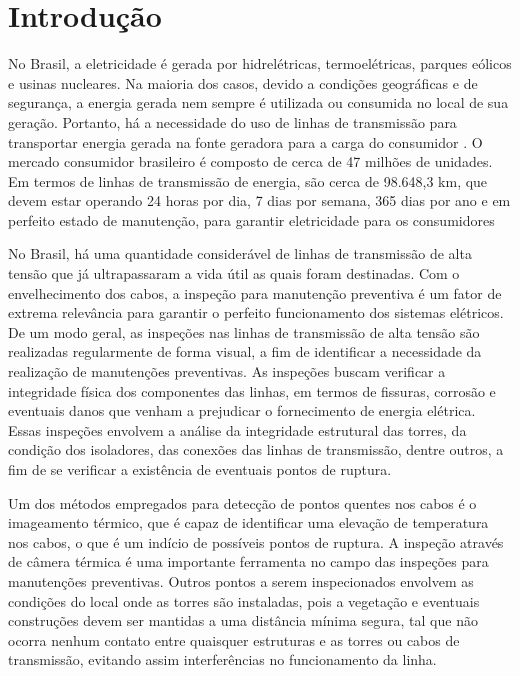 \chapter{Introdução}
\label{chap:intro}

No Brasil, a eletricidade é gerada por hidrelétricas, termoelétricas, parques eólicos e usinas nucleares. Na maioria dos casos, devido a condições geográficas e de segurança, a energia gerada nem sempre é utilizada ou consumida no local de sua geração. Portanto, há a necessidade do uso de linhas de transmissão para transportar energia gerada na fonte geradora para a carga do consumidor \cite{rangel2009sistema}. O mercado consumidor brasileiro é composto de cerca de 47 milhões de unidades. Em termos de linhas de transmissão de energia, são cerca de 98.648,3 km, que devem estar operando 24 horas por dia, 7 dias por semana, 365 dias por ano e em perfeito estado de manutenção, para garantir eletricidade para os consumidores \cite{ons2013dados}

No Brasil, há uma quantidade considerável de linhas de transmissão de alta tensão que já ultrapassaram a vida útil as quais foram destinadas. Com o envelhecimento dos cabos, a inspeção para manutenção preventiva é um fator de extrema relevância para garantir o perfeito funcionamento dos sistemas elétricos. 
De um modo geral, as inspeções nas linhas de transmissão de alta tensão são realizadas regularmente de forma visual, a fim de identificar a necessidade da realização de manutenções preventivas. 
As inspeções buscam verificar a integridade física dos componentes das linhas, em termos de fissuras, corrosão e eventuais danos que venham a prejudicar o fornecimento de energia elétrica. Essas inspeções envolvem a análise da integridade estrutural das torres, da condição dos isoladores, das conexões das linhas de transmissão, dentre outros, a fim de se verificar a existência de eventuais pontos de ruptura. 

Um dos métodos empregados para detecção de pontos quentes nos cabos é o imageamento térmico, que é capaz de identificar uma elevação de temperatura nos cabos, o que é um indício de possíveis pontos de ruptura. A inspeção através de câmera térmica é uma importante ferramenta no campo das inspeções para manutenções preventivas. 
Outros pontos a serem inspecionados envolvem as condições do local onde as torres são instaladas, pois a vegetação e eventuais construções devem ser mantidas a uma distância mínima segura, tal que não ocorra nenhum contato entre quaisquer estruturas e as torres ou cabos de transmissão, evitando assim interferências no funcionamento da linha. 

